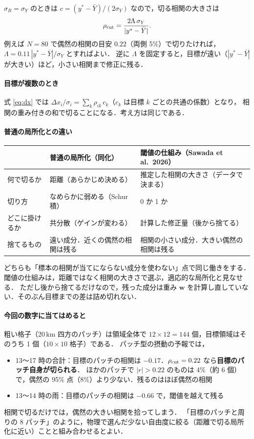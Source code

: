 \documentclass[dvipdfmx,a4paper,10.5pt]{jarticle}
\numberwithin{equation}{section}
\begin{document}
$\sigma_R=\sigma_Y$ のときは $c=(y^*-\bar Y)/(2\sigma_Y)$ なので，切る相関の大きさは
\begin{equation}
  \rho_{\rm cut}=\frac{2\Lambda\,\sigma_Y}{|y^*-\bar Y|}.
\end{equation}
例えば $N=80$ で偶然の相関の目安 $0.22$（両側 5\%）で切りたければ，$\Lambda=0.11\,|y^*-\bar Y|/\sigma_Y$ とすればよい．
逆に $\Lambda$ を固定すると，目標が遠い（$|y^*-\bar Y|$ が大きい）ほど，小さい相関まで修正に残る．

\paragraph{目標が複数のとき}
式 \eqref{eq:dx} では $\Delta x_i/\sigma_i=\sum_k \rho_{ik}\,c_k$（$c_k$ は目標 $k$ ごとの共通の係数）となり，
相関の重み付きの和で切ることになる．考え方は同じである．

\paragraph{普通の局所化との違い}
\begin{center}
\begin{tabular}{lll}\toprule
 & 普通の局所化（同化） & 閾値の仕組み（Sawada et al.\ 2026） \\ \midrule
何で切るか & 距離（あらかじめ決める） & 推定した相関の大きさ（データで決まる） \\
切り方 & なめらかに弱める（Schur 積） & 0 か 1 か \\
どこに掛けるか & 共分散（ゲインが変わる） & 計算した修正量（後から捨てる） \\
捨てるもの & 遠い成分．近くの偶然の相関は残る & 相関の小さい成分．大きい偶然の相関は残る \\ \bottomrule
\end{tabular}
\end{center}
どちらも「標本の相関が当てにならない成分を使わない」点で同じ働きをする．
閾値の仕組みは，距離ではなく相関の大きさで選ぶ，適応的な局所化と見なせる．
ただし後から捨てるだけなので，残った成分は重み $\bm w$ を計算し直していない．そのぶん目標までの差は詰め切れない．

\paragraph{今回の数字に当てはめると}
粗い格子（20\,km 四方のパッチ）は領域全体で $12\times12=144$ 個，目標領域はそのうち 1 個（$10\times10$ 格子）である．
パッチ型の摂動の予報では，
\begin{itemize}
  \item 13〜17 時の合計：目標のパッチの相関は $-0.17$．$\rho_{\rm cut}=0.22$ なら\textbf{目標のパッチ自身が切られる}．
        ほかのパッチで $|r|>0.22$ のものは 4\%（約 6 個）で，偶然の 95\% 点（8\%）より少ない．残るのはほぼ偶然の相関
  \item 13〜14 時の雨：目標のパッチの相関は $-0.66$ で，閾値を越えて残る
\end{itemize}
相関で切るだけでは，偶然の大きい相関を拾ってしまう．
「目標のパッチと周りの 8 パッチ」のように，物理で選んだ少ない自由度に絞る（距離で切る局所化に近い）ことと組み合わせるとよい．
\end{document}
